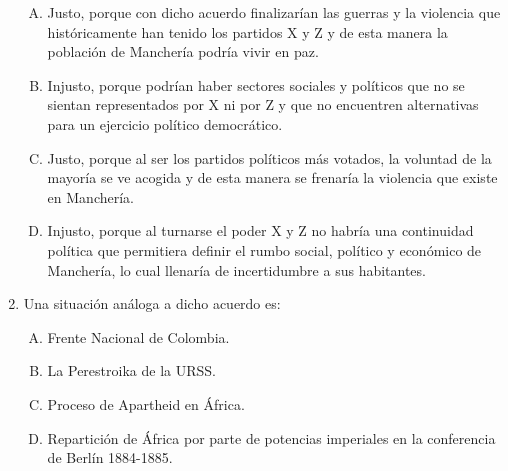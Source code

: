\begin{enumerate}
\begin{enumerate}[(A)]
\item Justo, porque con dicho acuerdo finalizarían las guerras y la violencia que históricamente han tenido los partidos X y Z y de esta manera la población de Manchería podría vivir en paz.
\item Injusto, porque podrían haber sectores sociales y políticos que no se sientan representados por X ni por Z y que no encuentren alternativas para un ejercicio político democrático.
\item Justo, porque al ser los partidos políticos más votados, la voluntad de la mayoría se ve acogida y de esta manera se frenaría la violencia que existe en Manchería. 
\item Injusto, porque al turnarse el poder X y Z no habría una continuidad política que permitiera definir el rumbo social, político y económico de Manchería, lo cual llenaría de incertidumbre a sus habitantes.

\end{enumerate}

\item Una situación análoga a dicho acuerdo es:\label{socandres-25}

\begin{enumerate}[(A)]
\item Frente Nacional de Colombia.
\item La Perestroika de la URSS.
\item Proceso de Apartheid en África.
\item Repartición de África por parte de potencias imperiales en la conferencia de Berlín 1884-1885.
\end{enumerate}


\end{enumerate}


